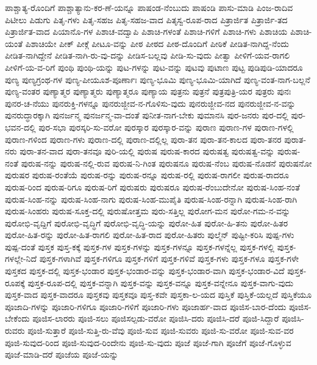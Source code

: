 {ಪಾಶ್ಚಾತ್ಯ-ರೊಂದಿಗೆ
ಪಾಶ್ಚಾತ್ಯಾನು-ಕರ-ಣೆ-ಯನ್ನೂ
ಪಾಷಂಡ-ನೆಂಬುದು
ಪಾಷಂಡಿ
ಪಾಸು-ಮಾಡಿ
ಪಿಂಜ-ರಾದಿವ
ಪಿಟೀಲು
ಪಿಡುಗು
ಪಿತೃ-ಗಳು
ಪಿತೃ-ಸಹಜ
ಪಿತೃ-ಸಹಜ-ವಾದ
ಪಿತೃಸ್ವ-ರೂಪ-ರಾದ
ಪಿತ್ರಾರ್ಜಿತ
ಪಿತ್ರಾರ್ಜಿ-ತದ
ಪಿತ್ರಾರ್ಜಿತ-ವಾದ
ಪಿಯಾನೊ-ಗಳ
ಪಿಶಾಚ-ವದ್ವಾಪಿ
ಪಿಶಾಚಿ-ಗಳಂತೆ
ಪಿಶಾಚಿ-ಗಳಿಗೆ
ಪಿಶಾಚಿ-ಗಳು
ಪಿಶಾಚಿಯ
ಪಿಶಾಚಿ-ಯಂತೆ
ಪಿಶಾಚಿಯೇ
ಪೀಕ್
ಪೀಕ್ಗೆ
ಪೀಟೂ-ವನ್ನು
ಪೀಠ
ಪೀಠದ
ಪೀಠ-ದೊಂದಿಗೆ
ಪೀಠಿಕೆ
ಪೀಡಿತ-ನಾಗಿದ್ದ-ನೆಂದು
ಪೀಡಿತ-ನಾಗಿದ್ದೇನೆ
ಪೀಡಿತ-ನಾಗಿ-ರು-ವು-ದನ್ನು
ಪೀಡಿಸ-ಬಲ್ಲವು
ಪೀಡಿ-ಸು-ವುದು
ಪೀತ್ವಾ
ಪೀಳಿಗೆ-ಯವ-ರಾಗಲಿ
ಪೀಳಿಗೆ-ಯ-ವ-ರಿಗೆ
ಪುಂಥಿ
ಪುಂಥಿ-ಯನ್ನು
ಪುಟ-ಗಳನ್ನು
ಪುಟ-ವನ್ನು
ಪುಟವು
ಪುಟಾಣ
ಪುಟ್ಟ
ಪುಡಿಪುಡಿ-ಯಾದರೂ
ಪುಣ್ಯ
ಪುಣ್ಯಗ್ರಂಥ-ಗಳ
ಪುಣ್ಯ-ಪೀಯೂಶ-ಪೂರ್ಣಾಃ
ಪುಣ್ಯ-ಭೂಮಿ
ಪುಣ್ಯ-ಭೂಮಿ-ಯಾಗಿದೆ
ಪುಣ್ಯ-ವಂತ-ನಾಗ-ಬಲ್ಲನೆ
ಪುಣ್ಯ-ವಂತರ
ಪುಣ್ಯಾತ್ಮರ
ಪುಣ್ಯಾತ್ಮರು
ಪುಣ್ಯಾತ್ಮರೂ
ಪುಣ್ಯಾಯ
ಪುತ್ರನು
ಪುತ್ರನೆ
ಪುತ್ರಪುತ್ರಿ-ಯರ
ಪುತ್ರರು
ಪುನಃ
ಪುನರ-ಚ-ನೆಯು
ಪುನರುಕ್ತಿ-ಗಳನ್ನೂ
ಪುನರುಜ್ಜೀವ-ನ-ಗೊಳಿಸು-ವುದು
ಪುನರುಜ್ಜೀವ-ನದ
ಪುನರುಜ್ಜೀವ-ನ-ವನ್ನು
ಪುನರುದ್ಧಾರಕ್ಕಾಗಿ
ಪುನರ್ಜನ್ಮ
ಪುನರ್ಜನ್ಮ-ವಾ-ದಂತೆ
ಪುನೀತ-ನಾಗ-ಬೇಕು
ಪುಮಾನಸಿ
ಪುರ-ಜನರು
ಪುರ-ದಲ್ಲಿ
ಪುರ-ಭವನ-ದಲ್ಲಿ
ಪುರ-ಸಭಾ
ಪುರಸ್ಕರಿ-ಸು-ವರೋ
ಪುರಸ್ಕಾರ
ಪುರಸ್ಕಾರ-ವನ್ನು
ಪುರಾಣ
ಪುರಾಣ-ಗಳ
ಪುರಾಣ-ಗಳಲ್ಲಿ
ಪುರಾಣ-ಗಳಿಂದ
ಪುರಾಣ-ಗಳು
ಪುರಾಣ-ದಲ್ಲಿ
ಪುರಾಣ-ದಲ್ಲಿಲ್ಲ
ಪುರಾ-ತನ
ಪುರಾ-ತನ-ಕಾಲದ
ಪುರಾ-ತನರ
ಪುರಾತ-ನರು
ಪುರಾ-ತನ-ವಾದ
ಪುರಾ-ತನವೂ
ಪುರಿ-ಯಲ್ಲಿ
ಪುರುಷ
ಪುರುಷ-ಕಾರದ
ಪುರುಷತ್ವ
ಪುರುಷತ್ವ-ವನ್ನು
ಪುರುಷ-ನಂತೆ
ಪುರುಷ-ನನ್ನು
ಪುರುಷ-ನಲ್ಲಿ-ರುವ
ಪುರುಷ-ನಿ-ಗಿಂತ
ಪುರುಷನೂ
ಪುರುಷ-ನೆಂಬ
ಪುರುಷ-ನೊಡನೆ
ಪುರುಷನೋ
ಪುರುಷರ
ಪುರುಷ-ರಂತೆಯೆ
ಪುರುಷ-ರನ್ನು
ಪುರುಷ-ರನ್ನೂ
ಪುರುಷ-ರಲ್ಲಿ
ಪುರುಷ-ರಾಗಲೀ
ಪುರುಷ-ರಾದರೂ
ಪುರುಷ-ರಿಂದ
ಪುರುಷ-ರಿಗೂ
ಪುರುಷ-ರಿಗೆ
ಪುರುಷರು
ಪುರುಷರೂ
ಪುರುಷ-ರೆಂಬುದೇನೋ
ಪುರುಷ-ಸಿಂಹ-ನಂತೆ
ಪುರುಷ-ಸಿಂಹ-ನನ್ನು
ಪುರುಷ-ಸಿಂಹ-ನಾಗು
ಪುರುಷ-ಸಿಂಹ-ಮುಪೈತಿ
ಪುರುಷ-ಸಿಂಹ-ರನ್ನಾಗಿ
ಪುರುಷ-ಸಿಂಹ-ರಾಗಿ
ಪುರುಷ-ಸಿಂಹರು
ಪುರುಷ-ಸೂಕ್ತ-ದಲ್ಲಿ
ಪುರುಷೋತ್ತಮ
ಪುರು-ಸತ್ತಿಲ್ಲ
ಪುರೋಗ-ಮನ
ಪುರೋ-ಗಮ-ನ-ವನ್ನು
ಪುರೋಭಿ-ವೃದ್ದಿಗೆ
ಪುರೋಭಿ-ವೃದ್ಧಿಗೆ
ಪುರೋಭಿ-ವೃದ್ಧಿ-ಯನ್ನು
ಪುರೋ-ಹಿತ
ಪುರೋ-ಹಿ-ತನು
ಪುರೋ-ಹಿತರ
ಪುರೋ-ಹಿತ-ರನ್ನು
ಪುರೋ-ಹಿತ-ರಾಗಲಿ
ಪುರೋ-ಹಿತ-ರಾದ
ಪುರೋ-ಹಿತರು
ಪುಲ್ಮೆನ್
ಪುಷ್ಟೀ-ಕರಿಸಿ
ಪುಷ್ಪ-ಗಳು
ಪುಷ್ಪ-ದಂತೆ
ಪುಸ್ತಕ
ಪುಸ್ತ-ಕಕ್ಕೆ
ಪುಸ್ತಕ-ಗಳ
ಪುಸ್ತಕ-ಗಳನ್ನು
ಪುಸ್ತಕ-ಗಳನ್ನೂ
ಪುಸ್ತಕ-ಗಳನ್ನೆಲ್ಲ
ಪುಸ್ತಕ-ಗಳಲ್ಲಿ
ಪುಸ್ತಕ-ಗಳಲ್ಲೇ-ನಿದೆ
ಪುಸ್ತಕ-ಗಳಾಗಿವೆ
ಪುಸ್ತಕ-ಗಳಿಗೂ
ಪುಸ್ತಕ-ಗಳಿಗೆ
ಪುಸ್ತಕ-ಗಳಿವೆ
ಪುಸ್ತಕ-ಗಳು
ಪುಸ್ತಕ-ಗಳೂ
ಪುಸ್ತಕ-ಗಳೇ
ಪುಸ್ತಕದ
ಪುಸ್ತಕ-ದಲ್ಲಿ
ಪುಸ್ತಕ-ಭಂಡಾರ
ಪುಸ್ತಕ-ಭಂಡಾರ-ವನ್ನು
ಪುಸ್ತಕ-ಭಂಡಾರ-ವಾಗಿ
ಪುಸ್ತಕ-ಭಂಡಾರ-ವಿದೆ
ಪುಸ್ತಕ-ರೂಪಕ್ಕೆ
ಪುಸ್ತಕ-ರೂಪ-ದಲ್ಲಿ
ಪುಸ್ತಕ-ವನ್ನಾಗಿ
ಪುಸ್ತಕ-ವನ್ನು
ಪುಸ್ತಕ-ವನ್ನೂ
ಪುಸ್ತಕ-ವನ್ನೇನೂ
ಪುಸ್ತಕ-ವಾಗು-ವುದು
ಪುಸ್ತಕ-ವಾದ
ಪುಸ್ತಕ-ವಾದರೂ
ಪುಸ್ತಕವು
ಪುಸ್ತಕವೂ
ಪುಸ್ತ-ಕವೇ
ಪುಸ್ತಕಾ-ಲ-ಯದ
ಪುಸ್ತಿಕೆ
ಪುಸ್ತಿಕೆ-ಯಲ್ಲದೆ
ಪುಸ್ತಿಕೆಯೂ
ಪೂಜಾದಿ-ಗಳನ್ನು
ಪೂಜಾರಿ-ಗಳಿಗೂ
ಪೂಜಾರಿ-ಗಳಿಗೆ
ಪೂಜಾರಿ-ಗಳು
ಪೂಜಾರ್ಹ-ವಾದ
ಪೂಜಿಸ-ಬಾರ-ದೆಂದು
ಪೂಜಿಸ-ಬೇಕೆಂದು
ಪೂಜಿಸ-ಲಾರರು
ಪೂಜಿ-ಸಲು
ಪೂಜಿಸಲ್ಪಡು-ವರೋ
ಪೂಜಿಸಿ-ದರು
ಪೂಜಿಸಿ-ದರೆ
ಪೂಜಿ-ಸಿದ್ದಾರೆ
ಪೂಜಿಸಿ-ರುವರು
ಪೂಜಿ-ಸುತ್ತಾರೆ
ಪೂಜಿ-ಸುತ್ತಿ-ರು-ವೆವು
ಪೂಜಿ-ಸುವ
ಪೂಜಿ-ಸುವರು
ಪೂಜಿ-ಸು-ವರೋ
ಪೂಜಿ-ಸುವ-ವರ
ಪೂಜಿ-ಸುವುದ-ರಿಂದ
ಪೂಜಿ-ಸುವುದ-ರಿಂದೇನು
ಪೂಜಿ-ಸು-ವುದು
ಪೂಜೆ
ಪೂಜೆ-ಗಾಗಿ
ಪೂಜೆಗೆ
ಪೂಜೆ-ಗೊಳ್ಳುವ
ಪೂಜೆ-ಮಾಡಿ-ದರೆ
ಪೂಜೆಯ
ಪೂಜೆ-ಯನ್ನು
}

